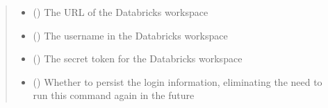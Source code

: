 \documentclass[letterpaper,10pt,english]{sphinxmanual}
\begin{document}
\begin{fulllineitems}
\begin{fulllineitems}
\begin{sphinxVerbatim}[commandchars=\\\{\}]
 
  
\end{sphinxVerbatim}
\begin{quote}\begin{description}
\begin{itemize}
\item {} 
\sphinxAtStartPar
{} (\sphinxstyleliteralemphasis{\sphinxupquote{ (}}\sphinxstyleliteralemphasis{\sphinxupquote{)}}) \textendash{} The URL of the Databricks workspace

\item {} 
\sphinxAtStartPar
{} (\sphinxstyleliteralemphasis{\sphinxupquote{ (}}\sphinxstyleliteralemphasis{\sphinxupquote{)}}) \textendash{} The username in the Databricks workspace

\item {} 
\sphinxAtStartPar
{} (\sphinxstyleliteralemphasis{\sphinxupquote{ (}}\sphinxstyleliteralemphasis{\sphinxupquote{)}}) \textendash{} The secret token for the Databricks workspace

\item {} 
\sphinxAtStartPar
{} (\sphinxstyleliteralemphasis{\sphinxupquote{ (}}\sphinxstyleliteralemphasis{\sphinxupquote{)}}) \textendash{} Whether to persist the login information, eliminating
the need to run this command again in the future


\end{itemize}
\end{description}
\end{quote}
\end{fulllineitems}
\end{fulllineitems}
\end{document}
